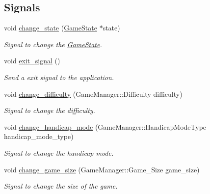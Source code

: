 \subsection*{Signals}
\begin{DoxyCompactItemize}
\item 
\hypertarget{class_game_state_ad23b11eedef61cd2f24cca1f89c4088a}{void \hyperlink{class_game_state_ad23b11eedef61cd2f24cca1f89c4088a}{change\-\_\-state} (\hyperlink{class_game_state}{Game\-State} $\ast$state)}\label{class_game_state_ad23b11eedef61cd2f24cca1f89c4088a}

\begin{DoxyCompactList}\small\item\em Signal to change the \hyperlink{class_game_state}{Game\-State}. \end{DoxyCompactList}\item 
\hypertarget{class_game_state_afd2827b7fa9f6d7fe5cdaeb991c510a9}{void \hyperlink{class_game_state_afd2827b7fa9f6d7fe5cdaeb991c510a9}{exit\-\_\-signal} ()}\label{class_game_state_afd2827b7fa9f6d7fe5cdaeb991c510a9}

\begin{DoxyCompactList}\small\item\em Send a exit signal to the application. \end{DoxyCompactList}\item 
\hypertarget{class_game_state_a1275534bce2a4699db2ca708c33b6588}{void \hyperlink{class_game_state_a1275534bce2a4699db2ca708c33b6588}{change\-\_\-difficulty} (Game\-Manager\-::\-Difficulty difficulty)}\label{class_game_state_a1275534bce2a4699db2ca708c33b6588}

\begin{DoxyCompactList}\small\item\em Signal to change the difficulty. \end{DoxyCompactList}\item 
\hypertarget{class_game_state_a6476b36b7d1cd6d5c1b586ecb8677c91}{void \hyperlink{class_game_state_a6476b36b7d1cd6d5c1b586ecb8677c91}{change\-\_\-handicap\-\_\-mode} (Game\-Manager\-::\-Handicap\-Mode\-Type handicap\-\_\-mode\-\_\-type)}\label{class_game_state_a6476b36b7d1cd6d5c1b586ecb8677c91}

\begin{DoxyCompactList}\small\item\em Signal to change the handicap mode. \end{DoxyCompactList}\item 
\hypertarget{class_game_state_ac66c8bcd0fd40ed2c0d190d4c5626823}{void \hyperlink{class_game_state_ac66c8bcd0fd40ed2c0d190d4c5626823}{change\-\_\-game\-\_\-size} (Game\-Manager\-::\-Game\-\_\-\-Size game\-\_\-size)}\label{class_game_state_ac66c8bcd0fd40ed2c0d190d4c5626823}

\begin{DoxyCompactList}\small\item\em Signal to change the size of the game. \end{DoxyCompactList}\end{DoxyCompactItemize}
